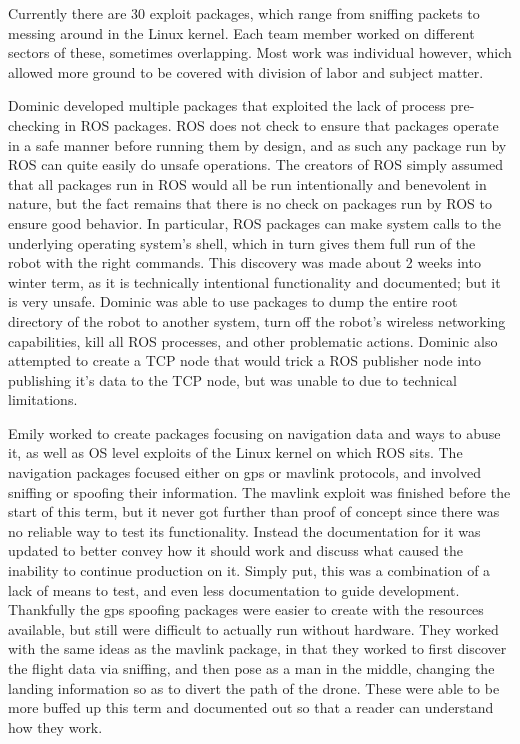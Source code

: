 \documentclass[IEEEtran,letterpaper,10pt,notitlepage,draftclsnofoot,onecolumn]{article}
\begin{document}
Currently there are 30 exploit packages, which range from sniffing packets to messing around in the Linux kernel.
Each team member worked on different sectors of these, sometimes overlapping.
Most work was individual however, which allowed more ground to be covered with division of labor and subject matter.

Dominic developed multiple packages that exploited the lack of process pre-checking
in ROS packages. ROS does not check to ensure that packages operate in a safe manner before running
them by design, and as such any package run by ROS can quite easily do unsafe operations. The creators of
ROS simply assumed that all packages run in ROS would all be run intentionally and benevolent in nature,
but the fact remains that there is no check on packages run by ROS to ensure good behavior. In particular,
ROS packages can make system calls to the underlying operating system's shell, which in turn gives them full
run of the robot with the right commands. This discovery was made about 2 weeks into winter term, as it is
technically intentional functionality and documented; but it is very unsafe. Dominic was able to use packages
to dump the entire root directory of the robot to another system, turn off the robot's wireless networking
capabilities, kill all ROS processes, and other problematic actions. Dominic also attempted to create a TCP node
that would trick a ROS publisher node into publishing it's data to the TCP node, but was unable to due to
technical limitations.

Emily worked to create packages focusing on navigation data and ways to abuse it, as well as OS level exploits of the Linux kernel on which ROS sits.
The navigation packages focused either on gps or mavlink protocols, and involved sniffing or spoofing their information.
The mavlink exploit was finished before the start of this term, but it never got further than proof of concept since there was no reliable way to test its functionality.
Instead the documentation for it was updated to better convey how it should work and discuss what caused the inability to continue production on it.
Simply put, this was a combination of a lack of means to test, and even less documentation to guide development.
Thankfully the gps spoofing packages were easier to create with the resources available, but still were difficult to actually run without hardware.
They worked with the same ideas as the mavlink package, in that they worked to first discover the flight data via sniffing, and then pose as a man in the middle, changing the landing information so as to divert the path of the drone.
These were able to be more buffed up this term and documented out so that a reader can understand how they work.
\end{document}
